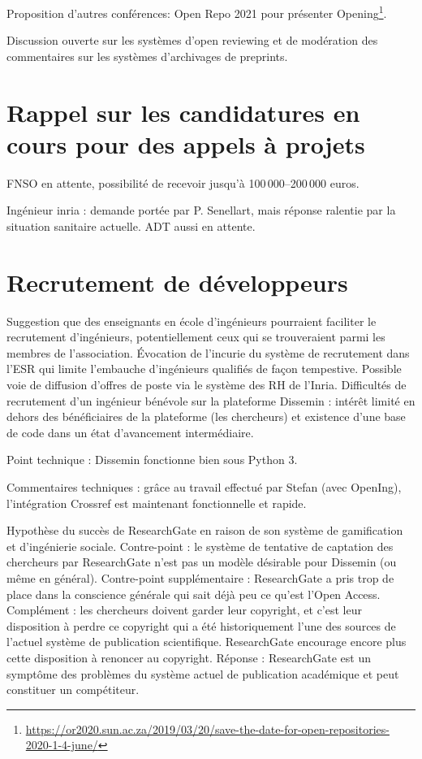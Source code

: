 \documentclass[a4paper]{article}
\begin{document}
Proposition d'autres conférences: Open Repo 2021 pour présenter
Opening\footnote{\tiny \url{https://or2020.sun.ac.za/2019/03/20/save-the-date-for-open-repositories-2020-1-4-june/}}.

Discussion ouverte sur les systèmes d'open reviewing et de modération des commentaires sur les systèmes d'archivages de preprints. 

\section{Rappel sur les candidatures en cours pour des appels à projets}
FNSO en attente, possibilité de recevoir jusqu'à 100\,000--200\,000 euros. 

Ingénieur inria : demande portée par P. Senellart, mais réponse ralentie par la situation sanitaire actuelle.
ADT aussi en attente. 

\section{Recrutement de développeurs}
Suggestion que des enseignants en école d'ingénieurs pourraient faciliter le recrutement d'ingénieurs, potentiellement ceux qui se trouveraient parmi les membres de l'association. 
Évocation de l'incurie du système de recrutement dans l'ESR qui limite l'embauche d'ingénieurs qualifiés de façon tempestive. 
Possible voie de diffusion d'offres de poste via le système des RH de l'Inria.
Difficultés de recrutement d'un ingénieur bénévole sur la plateforme Dissemin : intérêt limité en dehors des bénéficiaires de la plateforme (les chercheurs) et existence d'une base de code dans un état d'avancement intermédiaire.

Point technique : Dissemin fonctionne bien sous Python 3. 

Commentaires techniques : grâce au travail effectué par Stefan (avec OpenIng), l'intégration Crossref est maintenant fonctionnelle et rapide. 

Hypothèse du succès de ResearchGate en raison de son système de gamification et d'ingénierie sociale. 
Contre-point : le système de tentative de captation des chercheurs par ResearchGate n'est pas un modèle désirable pour Dissemin (ou même en général). 
Contre-point supplémentaire : ResearchGate a pris trop de place dans la
conscience générale qui sait déjà peu ce qu'est l'Open Access. 
Complément : les chercheurs doivent garder leur copyright, et c'est leur disposition à perdre ce copyright qui a été historiquement l'une des sources de l'actuel système de publication scientifique. ResearchGate encourage encore plus cette disposition à renoncer au copyright.
Réponse : ResearchGate est un symptôme des problèmes du système actuel de
publication académique et peut constituer un compétiteur.
\end{document}
